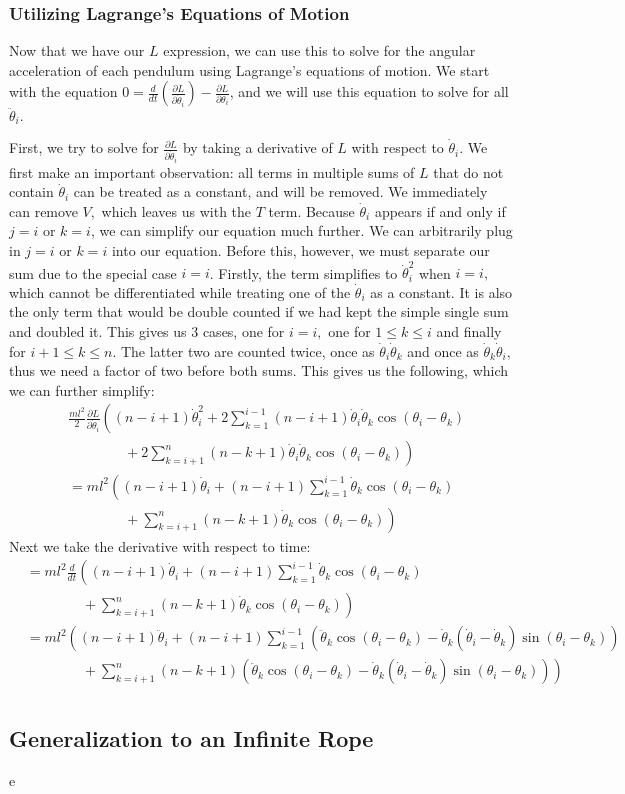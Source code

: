 \documentclass{article}
\begin{document}
\subsubsection{Utilizing Lagrange's Equations of Motion}
Now that we have our $L$ expression, we can use this to solve for the angular acceleration of each pendulum using Lagrange's equations of motion. We start with the equation $0 = \frac{d}{dt}\left(\frac{\partial L}{\partial \dot \theta_i}\right) - \frac{\partial L}{\partial \theta_i}$, and we will use this equation to solve for all $\ddot\theta_i.$

First, we try to solve for $\frac{\partial L}{\partial \dot \theta_i}$ by taking a derivative of $L$ with respect to $\dot\theta_i$. We first make an important observation: all terms in multiple sums of $L$ that do not contain $\dot\theta_i$ can be treated as a constant, and will be removed. We immediately can remove $V,$ which leaves us with the $T$ term. Because $\dot\theta_i$ appears if and only if $j=i$ or $k=i$, we can simplify our equation much further. We can arbitrarily plug in $j=i$ or $k=i$ into our equation. Before this, however, we must separate our sum due to the special case $i=i$. Firstly, the term simplifies to $\dot\theta_i^2$ when $i=i,$ which cannot be differentiated while treating one of the $\dot\theta_i$ as a constant. It is also the only term that would be double counted if we had kept the simple single sum and doubled it. This gives us 3 cases, one for $i=i,$ one for $1\leq k\le i$ and finally for $i+1\leq k \leq n$. The latter two are counted twice, once as $\dot\theta_i\dot\theta_k$ and once as $\dot\theta_k\dot\theta_i,$ thus we need a factor of two before both sums. This gives us the following, which we can further simplify:
\begin{align*}
&\frac{ml^2}{2}\frac{\partial L}{\partial \dot \theta_i}\left((n-i+1)\dot\theta_i^2 + 2\sum_{k=1}^{i-1}(n-i+1)\dot\theta_i\dot\theta_k\cos(\theta_i-\theta_k)\right.\\
&\qquad\qquad+ \left.2\sum_{k=i+1}^n(n-k+1)\dot\theta_i\dot\theta_k\cos(\theta_i-\theta_k)\right)\\
&= ml^2\left((n-i+1)\dot\theta_i + (n-i+1)\sum_{k=1}^{i-1}\dot\theta_k\cos(\theta_i-\theta_k)\right.\\
&\qquad\qquad+ \left.\sum_{k=i+1}^n(n-k+1)\dot\theta_k\cos(\theta_i-\theta_k)\right)
\end{align*}
Next we take the derivative with respect to time:
\begin{align*}
&= ml^2\frac{d}{dt}\left((n-i+1)\dot\theta_i + (n-i+1)\sum_{k=1}^{i-1}\dot\theta_k\cos(\theta_i-\theta_k)\right.\\
&\qquad\qquad+ \left.\sum_{k=i+1}^n(n-k+1)\dot\theta_k\cos(\theta_i-\theta_k)\right)\\
&= ml^2\left((n-i+1)\ddot\theta_i + (n-i+1)\sum_{k=1}^{i-1}\left(\ddot\theta_k\cos(\theta_i-\theta_k)-\dot\theta_k(\dot\theta_i-\dot\theta_k)\sin(\theta_i-\theta_k)\right)\right.\\
&\qquad\qquad+ \left.\sum_{k=i+1}^n(n-k+1)\left(\ddot\theta_k\cos(\theta_i-\theta_k)-\dot\theta_k(\dot\theta_i-\dot\theta_k)\sin(\theta_i-\theta_k)\right)\right)\\
\end{align*}
\subsection{Generalization to an Infinite Rope}
e
\end{document}
